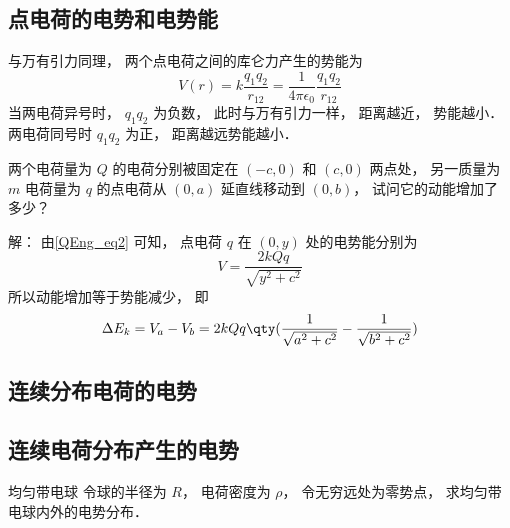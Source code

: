 \subsection{点电荷的电势和电势能}
与万有引力同理， 两个点电荷之间的库仑力产生的势能为
\begin{equation}\label{QEng_eq2}
V(r) = k \frac{q_1 q_2}{r_{12}} = \frac{1}{4\pi\epsilon_0} \frac{q_1 q_2}{r_{12}}
\end{equation}
当两电荷异号时， $q_1 q_2$ 为负数， 此时与万有引力一样， 距离越近， 势能越小． 两电荷同号时 $q_1 q_2$ 为正， 距离越远势能越小．

\begin{example}{}
两个电荷量为 $Q$ 的电荷分别被固定在 $(-c, 0)$ 和 $(c, 0)$ 两点处， 另一质量为 $m$ 电荷量为 $q$ 的点电荷从 $(0, a)$ 延直线移动到 $(0, b)$， 试问它的动能增加了多少？

解： 由\autoref{QEng_eq2} 可知， 点电荷 $q$ 在 $(0, y)$ 处的电势能分别为
\begin{equation}
V = \frac{2kQq}{\sqrt{y^2 + c^2}}
\end{equation}
所以动能增加等于势能减少， 即
\begin{equation}
\Delta E_k = V_a - V_b = 2kQq \qty(\frac{1}{\sqrt{a^2 + c^2}} - \frac{1}{\sqrt{b^2 + c^2}})
\end{equation}
\end{example}



\subsection{连续分布电荷的电势}


\subsection{连续电荷分布产生的电势}

\begin{example}{均匀带电球}
令球的半径为 $R$， 电荷密度为 $\rho$， 令无穷远处为零势点， 求均匀带电球内外的电势分布．

\end{example}


